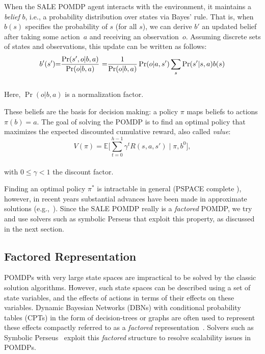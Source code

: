 \documentclass{aamas2014}
\providecommand{\E}{\mathbb{E}}
\providecommand{\SALEP}{SALE POMDP}
\begin{document}
When the \SALEP{} agent interacts with the environment, it maintains a \emph{belief} $b$, i.e., a probability distribution over states via Bayes' rule. That is, when $b(s)$ specifies the probability of $s$ (for all $s$), we can derive $b'$ an updated belief after taking some action~$a$ and receiving an observation~$o$. Assuming discrete sets of states and observations, this update can be written as follows:
\begin{equation}
b'(s')\hspace{-1mm}=\hspace{-1mm}\frac{ \Pr(s',o|b,a) } {\Pr(o|b,a)}\
\hspace{-1mm}=\hspace{-1mm}\frac{1}{ \Pr(o|b,a) }
\Pr(o|a,s')
\sum_s
\Pr(s'|s,a)
b(s)
\label{eq:BU}
\end{equation}\\[-2mm]
Here, $\Pr(o|b,a)$ is a normalization factor.

These beliefs are the basis for decision making: a policy $\pi$ maps beliefs to actions
$\pi(b)=a$. The goal of solving the POMDP is to find an optimal
policy that maximizes the expected discounted cumulative reward, also called
\emph{value}:\\[-2mm]
\begin{equation}
V(\pi)=\E\Big[\sum_{t=0}^{h-1} \gamma^t R(s,a,s') \mid \pi,b^0\Big],
\end{equation}\\[-3mm]
with $0\leq\gamma<1$ the discount factor.

Finding an optimal policy $\pi^*$ is intractable in general (PSPACE complete \cite{papadimitriou1987complexity}), however, in recent years substantial advances
have been made in approximate solutions (e.g.,~\cite{kurniawati2008sarsop,silver2010monte}). Since the \SALEP{} really is a \emph{factored} POMDP, we try and use solvers such as symbolic Perseus \cite{poupart2005exploiting} that exploit this property,  as discussed in the next section.

\subsection{Factored Representation}\label{sec:factored}

POMDPs with very large state spaces are impractical to be solved by the classic solution algorithms. However, such state spaces can be described using a set of state variables, and the effects of actions in terms of their effects on these variables. Dynamic Bayesian Networks (DBNs) with conditional probability tables (CPTs) in the form of decision-trees or
graphs are often used to represent these effects compactly referred to as a \textit{factored} representation~\cite{shani2013task}. Solvers such as Symbolic Perseus~\cite{poupart2005exploiting} exploit this \textit{factored} structure to resolve scalability issues in POMDPs.
\end{document}
